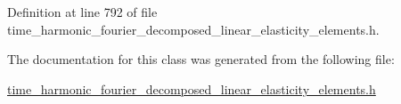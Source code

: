 Definition at line 792 of file time\+\_\+harmonic\+\_\+fourier\+\_\+decomposed\+\_\+linear\+\_\+elasticity\+\_\+elements.\+h.



The documentation for this class was generated from the following file\+:\begin{DoxyCompactItemize}
\item 
\hyperlink{time__harmonic__fourier__decomposed__linear__elasticity__elements_8h}{time\+\_\+harmonic\+\_\+fourier\+\_\+decomposed\+\_\+linear\+\_\+elasticity\+\_\+elements.\+h}\end{DoxyCompactItemize}
